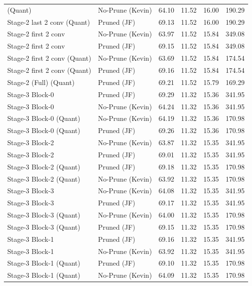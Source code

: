 \begin{table}
\begin{tabular}{llrrrr}
(Quant) & No-Prune (Kevin) & 64.10 & 11.52 & 16.00 & 190.29 \\
Stage-2 last 2 conv
(Quant) & Pruned (JF) & 69.13 & 11.52 & 16.00 & 190.29 \\
Stage-2 first 2 conv & No-Prune (Kevin) & 63.97 & 11.52 & 15.84 & 349.08 \\
Stage-2 first 2 conv & Pruned (JF) & 69.15 & 11.52 & 15.84 & 349.08 \\
Stage-2 first 2 conv
(Quant) & No-Prune (Kevin) & 63.69 & 11.52 & 15.84 & 174.54 \\
Stage-2 first 2 conv
(Quant) & Pruned (JF) & 69.16 & 11.52 & 15.84 & 174.54 \\
Stage-2 (Full)
(Quant) & Pruned (JF) & 69.21 & 11.52 & 15.79 & 169.29 \\
Stage-3 Block-0 & Pruned (JF) & 69.29 & 11.32 & 15.36 & 341.95 \\
Stage-3 Block-0 & No-Prune (Kevin) & 64.24 & 11.32 & 15.36 & 341.95 \\
Stage-3 Block-0
(Quant) & No-Prune (Kevin) & 64.19 & 11.32 & 15.36 & 170.98 \\
Stage-3 Block-0
(Quant) & Pruned (JF) & 69.26 & 11.32 & 15.36 & 170.98 \\
Stage-3 Block-2 & No-Prune (Kevin) & 63.87 & 11.32 & 15.35 & 341.95 \\
Stage-3 Block-2 & Pruned (JF) & 69.01 & 11.32 & 15.35 & 341.95 \\
Stage-3 Block-2
(Quant) & Pruned (JF) & 69.18 & 11.32 & 15.35 & 170.98 \\
Stage-3 Block-2
(Quant) & No-Prune (Kevin) & 63.92 & 11.32 & 15.35 & 170.98 \\
Stage-3 Block-3 & No-Prune (Kevin) & 64.08 & 11.32 & 15.35 & 341.95 \\
Stage-3 Block-3 & Pruned (JF) & 69.17 & 11.32 & 15.35 & 341.95 \\
Stage-3 Block-3
(Quant) & No-Prune (Kevin) & 64.00 & 11.32 & 15.35 & 170.98 \\
Stage-3 Block-3
(Quant) & Pruned (JF) & 69.15 & 11.32 & 15.35 & 170.98 \\
Stage-3 Block-1 & Pruned (JF) & 69.16 & 11.32 & 15.35 & 341.95 \\
Stage-3 Block-1 & No-Prune (Kevin) & 63.92 & 11.32 & 15.35 & 341.95 \\
Stage-3 Block-1
(Quant) & Pruned (JF) & 69.10 & 11.32 & 15.35 & 170.98 \\
Stage-3 Block-1
(Quant) & No-Prune (Kevin) & 64.09 & 11.32 & 15.35 & 170.98 \\

\end{tabular}
\end{table}
